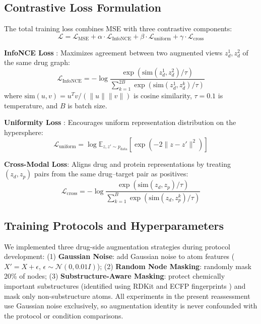 \documentclass[10pt,a4paper,twocolumn]{article}
\begin{document}
\subsection{Contrastive Loss Formulation}

The total training loss combines MSE with three contrastive components:
\begin{equation}
\mathcal{L} = \mathcal{L}_{\text{MSE}} + \alpha \cdot \mathcal{L}_{\text{InfoNCE}} + \beta \cdot \mathcal{L}_{\text{uniform}} + \gamma \cdot \mathcal{L}_{\text{cross}}
\end{equation}

\textbf{InfoNCE Loss} \cite{oord2018representation,chen2020simclr,he2020moco,gutmann2010nce}: Maximizes agreement between two augmented views $z_d^1, z_d^2$ of the same drug graph:
\begin{equation}
\mathcal{L}_{\text{InfoNCE}} = -\log \frac{\exp(\text{sim}(z_d^1, z_d^2) / \tau)}{\sum_{k=1}^{2B} \exp(\text{sim}(z_d^1, z_d^k) / \tau)}
\end{equation}
where $\text{sim}(u, v) = u^T v / (\|u\| \|v\|)$ is cosine similarity, $\tau = 0.1$ is temperature, and $B$ is batch size.

\textbf{Uniformity Loss} \cite{wang2020understanding}: Encourages uniform representation distribution on the hypersphere:
\begin{equation}
\mathcal{L}_{\text{uniform}} = \log \mathbb{E}_{z, z' \sim p_{\text{data}}} \left[\exp(-2\|z - z'\|^2)\right]
\end{equation}

\textbf{Cross-Modal Loss}: Aligns drug and protein representations by treating $(z_d, z_p)$ pairs from the same drug--target pair as positives:
\begin{equation}
\mathcal{L}_{\text{cross}} = -\log \frac{\exp(\text{sim}(z_d, z_p) / \tau)}{\sum_{k=1}^{B} \exp(\text{sim}(z_d, z_p^k) / \tau)}
\end{equation}

\subsection{Training Protocols and Hyperparameters}

We implemented three drug-side augmentation strategies during protocol development: (1) \textbf{Gaussian Noise}: add Gaussian noise to atom features ($X' = X + \epsilon$, $\epsilon \sim \mathcal{N}(0, 0.01 I)$); (2) \textbf{Random Node Masking}: randomly mask 20\% of nodes; (3) \textbf{Substructure-Aware Masking}: protect chemically important substructures (identified using RDKit \cite{landrum_rdkit} and ECFP fingerprints \cite{rogers2010ecfp}) and mask only non-substructure atoms. All experiments in the present reassessment use Gaussian noise exclusively, so augmentation identity is never confounded with the protocol or condition comparisons.
\end{document}
